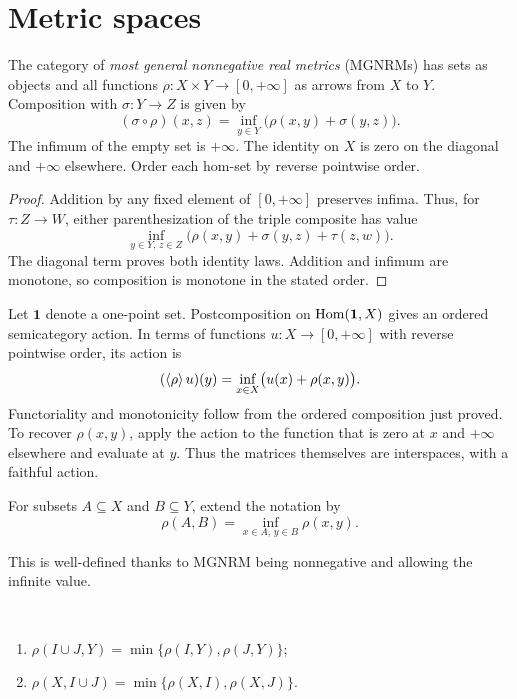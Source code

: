 \chapter{Metric spaces}

The category of \emph{most general nonnegative real metrics} (MGNRMs)
has sets as objects and all functions
$\rho:X\times Y\to[0,+\infty]$ as arrows from $X$ to $Y$. Composition
with $\sigma:Y\to Z$ is given by
\[
 (\sigma\circ\rho)(x,z)=\inf_{y\in Y}\bigl(\rho(x,y)+\sigma(y,z)\bigr).
\]
The infimum of the empty set is $+\infty$. The identity on $X$ is zero
on the diagonal and $+\infty$ elsewhere. Order each hom-set by reverse
pointwise order.

\begin{proof}
Addition by any fixed element of $[0,+\infty]$ preserves infima.
Thus, for $\tau:Z\to W$, either parenthesization of the triple composite
has value
\[
 \inf_{y\in Y,\,z\in Z}
 \bigl(\rho(x,y)+\sigma(y,z)+\tau(z,w)\bigr).
\]
The diagonal term proves both identity laws. Addition and infimum
are monotone, so composition is monotone in the stated order.
\end{proof}

Let $\mathbf{1}$ denote a one-point set. Postcomposition on
$\operatorname{Hom}(\mathbf{1},X)$ gives an ordered semicategory action. In terms of
functions $u:X\to[0,+\infty]$ with reverse pointwise order, its action is
\[
 (\left\langle \rho\right\rangle u)(y)=\inf_{x\in X}\bigl(u(x)+\rho(x,y)\bigr).
\]
Functoriality and monotonicity follow from the ordered composition
just proved. To recover $\rho(x,y)$, apply the action to the function
that is zero at $x$ and $+\infty$ elsewhere and evaluate at $y$.
Thus the matrices themselves are interspaces, with a faithful action.

\begin{defn}
For subsets $A\subseteq X$ and $B\subseteq Y$, extend the notation by
\[ \rho(A,B)=\inf_{x\in A,\,y\in B}\rho(x,y). \]
\end{defn}

\begin{rem}
This is well-defined thanks to MGNRM being nonnegative and allowing the infinite value.
\end{rem}

\begin{prop}
~
\begin{enumerate}
\item $\rho(I\cup J,Y) = \min\{\rho(I,Y), \rho(J,Y)\}$;
\item $\rho(X,I\cup J) = \min\{\rho(X,I), \rho(X,J)\}$.
\end{enumerate}
\end{prop}

